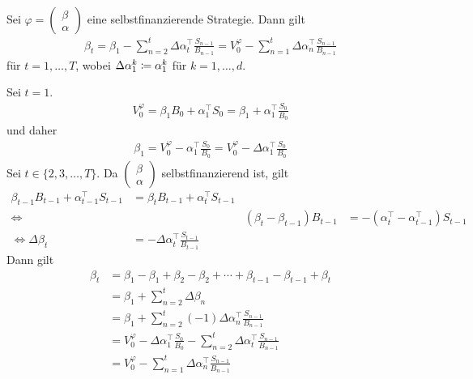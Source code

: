 \documentclass[a4paper,twoside,DIV15,BCOR12mm]{scrbook}
\begin{document}
\begin{lemma}
Sei $\varphi 
=\left(\begin{smallmatrix}
\beta \\ \alpha
\end{smallmatrix}\right)$ eine selbstfinanzierende Strategie. Dann gilt
\begin{align*}
\beta_t = \beta_1 - \sum_{n=2}^t \Delta \alpha_t^\top \frac{S_{n-1}}{B_{n-1}} 
= V_0^\varphi - \sum_{n=1}^t \Delta \alpha_n^\top \frac{S_{n-1}}{B_{n-1}}
\end{align*}
für $t=1,\ldots,T$, wobei $\Delta\alpha_1^k \da \alpha_1^k$ für $k=1,\ldots,d$.\label{lem:2.3.5}
\end{lemma}

\begin{beweis}
Sei $t=1$.
\begin{align*}
V_0^\varphi = \beta_1 B_0 + \alpha_1^\top S_0 = \beta_1 + \alpha_1^\top \frac{S_0}{B_0}
\end{align*}
und daher 
\begin{align*}
\beta_1 = V_0^\varphi - \alpha_1^\top \frac{S_0}{B_0} = V_0^\varphi - \Delta \alpha_1^\top \frac{S_0}{B_0}
\end{align*}
Sei $t\in\{2,3,\ldots,T\}$. Da $
\left(\begin{smallmatrix} \beta \\ \alpha \end{smallmatrix}\right)$
 selbstfinanzierend ist, gilt
\begin{align*}
\beta_{t-1}B_{t-1} + \alpha_{t-1}^\top S_{t-1} &=\beta_t B_{t-1} + \alpha_t^\top S_{t-1} \\
\iff && (\beta_t - \beta_{t-1})B_{t-1} &=  -(\alpha_t^\top - \alpha_{t-1}^\top)S_{t-1} \\
\iff \Delta \beta_t &= - \Delta \alpha_t^\top \frac{S_{t-1}}{B_{t-1}}
\end{align*}
Dann gilt
\begin{align*}
\beta_t &= \beta_1 - \beta_1 + \beta_2 - \beta_2 + \cdots + \beta_{t-1} -\beta_{t-1} + \beta_t\\
&= \beta_1 + \sum_{n=2}^t \Delta \beta_n\\
&= \beta_1 + \sum_{n=2}^t (-1)\Delta \alpha_n^\top \frac{S_{n-1}}{B_{n-1}}\\
&= V_0^\varphi - \Delta\alpha_1^\top \frac{S_0}{B_0} - \sum_{n=2}^t \Delta \alpha_t^\top \frac{S_{n-1}}{B_{n-1}} \\
&= V_0^\varphi - \sum_{n=1}^t \Delta \alpha_n ^\top \frac{S_{n-1}}{B_{n-1}}
\end{align*}
\end{beweis}
\end{document}

